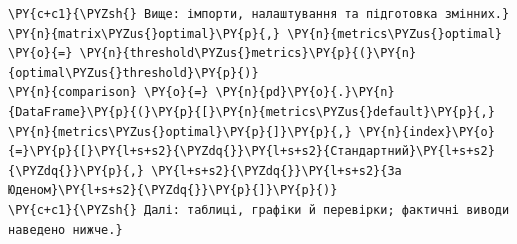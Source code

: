 \begin{Verbatim}[commandchars=\\\{\}]
\PY{c+c1}{\PYZsh{} Вище: імпорти, налаштування та підготовка змінних.}
\PY{n}{matrix\PYZus{}optimal}\PY{p}{,} \PY{n}{metrics\PYZus{}optimal} \PY{o}{=} \PY{n}{threshold\PYZus{}metrics}\PY{p}{(}\PY{n}{optimal\PYZus{}threshold}\PY{p}{)}
\PY{n}{comparison} \PY{o}{=} \PY{n}{pd}\PY{o}{.}\PY{n}{DataFrame}\PY{p}{(}\PY{p}{[}\PY{n}{metrics\PYZus{}default}\PY{p}{,} \PY{n}{metrics\PYZus{}optimal}\PY{p}{]}\PY{p}{,} \PY{n}{index}\PY{o}{=}\PY{p}{[}\PY{l+s+s2}{\PYZdq{}}\PY{l+s+s2}{Стандартний}\PY{l+s+s2}{\PYZdq{}}\PY{p}{,} \PY{l+s+s2}{\PYZdq{}}\PY{l+s+s2}{За Юденом}\PY{l+s+s2}{\PYZdq{}}\PY{p}{]}\PY{p}{)}
\PY{c+c1}{\PYZsh{} Далі: таблиці, графіки й перевірки; фактичні виводи наведено нижче.}
\end{Verbatim}
